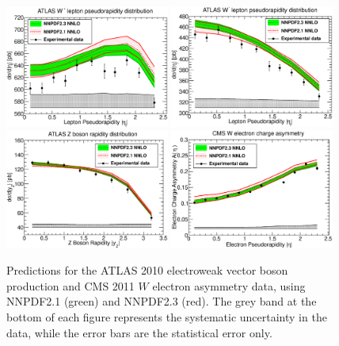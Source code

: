 \begin{figure}[h!]
\centering
\includegraphics[width=0.48\textwidth]{6-LHCimpact/figs/ATLASWZRAP36PB_0.eps}
\includegraphics[width=0.48\textwidth]{6-LHCimpact/figs/ATLASWZRAP36PB_1.eps}
\includegraphics[width=0.48\textwidth]{6-LHCimpact/figs/ATLASWZRAP36PB_2.eps}
\includegraphics[width=0.48\textwidth]{6-LHCimpact/figs/CMSWEASY840PB_0.eps}
\caption[Predictions for the ATLAS 2010 electroweak vector boson production and CMS 2011 $W$ electron asymmetry data, using NNPDF2.1 and NNPDF2.3]{Predictions for the ATLAS 2010 electroweak vector boson production and CMS 2011 $W$ electron asymmetry data, using NNPDF2.1 (green) and NNPDF2.3 (red). The grey band at the bottom of each figure represents the systematic uncertainty in the data, while the error bars are the statistical error only.}
\label{fig:ATLASplusCMSwzpred}
\end{figure}

